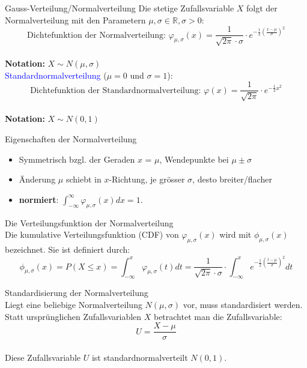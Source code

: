 \begin{definition}{Gauss-Verteilung/Normalverteilung}
Die stetige Zufallsvariable $X$ folgt der Normalverteilung mit den Parametern $\mu, \sigma \in \mathbb{R}, \sigma>0$:
\vspace{-2mm}\\
$$
\text{Dichtefunktion der Normalverteilung: }\varphi_{\mu,\sigma}(x)=\frac{1}{\sqrt{2\pi} \cdot \sigma} \cdot e^{-\frac{1}{2}(\frac{x-\mu}{\sigma})^2}
$$
\vspace{-5mm}\\
\textbf{Notation:} $X \sim N(\mu,\sigma)$
\vspace{2mm}\\
\textcolor{blue}{Standardnormalverteilung} ($\mu=0$ und $\sigma=1$):
\vspace{-3mm}\\
$$
\text{Dichtefunktion der Standardnormalverteilung: }\varphi(x)=\frac{1}{\sqrt{2\pi}} \cdot e^{-\frac{1}{2}x^2}
$$
\vspace{-5mm}\\
\textbf{Notation:} $X \sim N(0,1)$
\end{definition}

\begin{theorem}{Eigenschaften der Normalverteilung}
    \begin{itemize}
        \item Symmetrisch bzgl. der Geraden $x$ = $\mu$, Wendepunkte bei $\mu \pm \sigma$
        \item Änderung $\mu$ schiebt in $x$-Richtung,
        je grösser $\sigma$, desto breiter/flacher
        \item \textbf{normiert}: $\int_{-\infty}^{\infty} \varphi_{\mu,\sigma}(x)dx = 1$.
    \end{itemize}
\end{theorem}

\begin{definition}{Die Verteilungsfunktion der Normalverteilung}\\
Die kumulative Verteilungsfunktion (CDF) von $\varphi_{\mu,\sigma}(x)$ wird mit $\phi_{\mu,\sigma}(x)$ bezeichnet. Sie ist definiert durch:
\vspace{-2mm}\\
$$
\phi_{\mu,\sigma}(x) = P(X \leq x) = \int_{-\infty}^x \varphi_{\mu,\sigma}(t)dt = \frac{1}{\sqrt{2\pi} \cdot \sigma} \cdot \int_{-\infty}^x e^{-\frac{1}{2}(\frac{t-\mu}{\sigma})^2} dt
$$
\end{definition}

\begin{concept}{Standardisierung der Normalverteilung} \\
Liegt eine beliebige Normalverteilung $N(\mu,\sigma)$ vor, muss standardisiert werden. Statt ursprünglichen Zufallsvariablen $X$ betrachtet man die Zufallsvariable:
\vspace{-4mm}\\
$$
U = \frac{X-\mu}{\sigma}
$$
\vspace{-2mm}\\
Diese Zufallsvariable $U$ ist standardnormalverteilt $N(0,1)$.
\end{concept}

